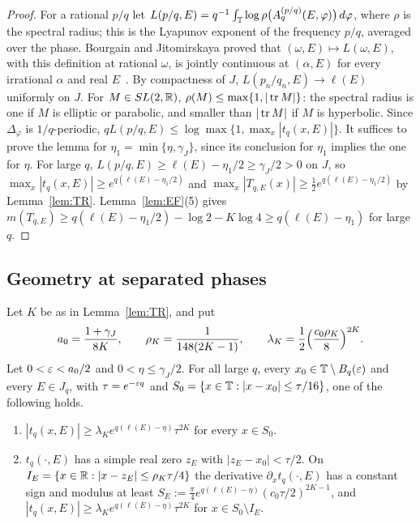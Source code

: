 \begin{proof}
For a rational $p/q$ let $L(p/q,E)=q^{-1}\int_\mathbb T\log\rho\bigl(A^{(p/q)}_q(E,\varphi)\bigr)\,d\varphi$, where $\rho$ is the spectral radius; this is the Lyapunov exponent of the frequency $p/q$, averaged over the phase. Bourgain and Jitomirskaya proved that $(\omega,E)\mapsto L(\omega,E)$, with this definition at rational $\omega$, is jointly continuous at $(\alpha,E)$ for every irrational $\alpha$ and real $E$~\cite[Theorem~1]{BourgainJitomirskaya2002}. By compactness of $J$, $L(p_n/q_n,E)\to\ell(E)$ uniformly on $J$. For $M\in SL(2,\mathbb R)$, $\rho(M)\le\max\{1,|\operatorname{tr} M|\}$: the spectral radius is one if $M$ is elliptic or parabolic, and smaller than $|\operatorname{tr} M|$ if $M$ is hyperbolic. Since $\Delta_\varphi$ is $1/q$-periodic, $qL(p/q,E)\le\log\max\{1,\max_x|t_q(x,E)|\}$. It suffices to prove the lemma for $\eta_1=\min\{\eta,\gamma_J\}$, since its conclusion for $\eta_1$ implies the one for $\eta$. For large $q$, $L(p/q,E)\ge\ell(E)-\eta_1/2\ge\gamma_J/2>0$ on $J$, so $\max_x|t_q(x,E)|\ge e^{q(\ell(E)-\eta_1/2)}$ and $\max_x|T_{q,E}(x)|\ge\frac12e^{q(\ell(E)-\eta_1/2)}$ by Lemma~\ref{lem:TR}. Lemma~\ref{lem:EF}(5) gives $m(T_{q,E})\ge q(\ell(E)-\eta_1/2)-\log2-K\log4\ge q(\ell(E)-\eta_1)$ for large $q$.
\end{proof}

\subsection{Geometry at separated phases}\label{sec:NG}

\begin{lemma}\label{lem:NGe}
Let $K$ be as in Lemma~\ref{lem:TR}, and put
\[
a_0=\frac{1+\gamma_J}{8K},\qquad\rho_K=\frac1{148(2K-1)},\qquad\lambda_K=\frac12\Bigl(\frac{c_0\rho_K}8\Bigr)^{2K}.
\]
Let $0<\varepsilon<a_0/2$ and $0<\eta\le\gamma_J/2$. For all large $q$, every $x_0\in\mathbb T\setminus B_q(\varepsilon)$ and every $E\in J_q$, with $\tau=e^{-\varepsilon q}$ and $S_0=\{x\in\mathbb T:|x-x_0|\le\tau/16\}$, one of the following holds.
\begin{enumerate}
\item[(i)] $|t_q(x,E)|\ge\lambda_Ke^{q(\ell(E)-\eta)}\tau^{2K}$ for every $x\in S_0$.
\item[(ii)] $t_q(\cdot,E)$ has a simple real zero $z_E$ with $|z_E-x_0|<\tau/2$. On $I_E=\{x\in\mathbb R:|x-z_E|\le\rho_K\tau/4\}$ the derivative $\partial_xt_q(\cdot,E)$ has a constant sign and modulus at least $S_E:=\frac\pi4e^{q(\ell(E)-\eta)}(c_0\tau/2)^{2K-1}$, and $|t_q(x,E)|\ge\lambda_Ke^{q(\ell(E)-\eta)}\tau^{2K}$ for $x\in S_0\setminus I_E$.
\end{enumerate}
\end{lemma}

